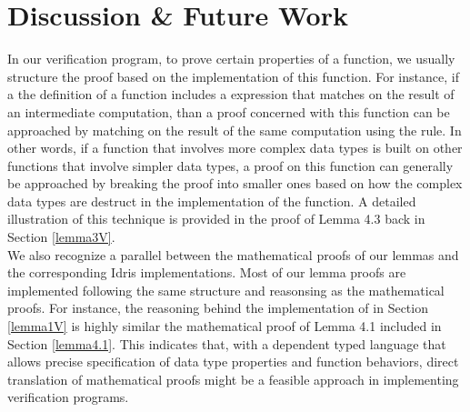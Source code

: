 \section{Discussion \& Future Work} \label{discussion}
In our verification program, to prove certain properties of a function, we usually structure the proof based on the implementation of this function. For instance, if a the definition of a function includes a  expression that matches on the result of an intermediate computation, than a proof concerned with this function can be approached by matching on the result of the same computation using the  rule. In other words, if a function that involves more complex data types is built on other functions that involve simpler data types, a proof on this function can generally be approached by breaking the proof into smaller ones based on how the complex data types are destruct in the implementation of the function. A detailed illustration of this technique is provided in the proof of Lemma 4.3 back in Section \ref{lemma3V}.
\\

We also recognize a parallel between the mathematical proofs of our lemmas and the corresponding Idris implementations. Most of our lemma proofs are implemented following the same structure and reasonsing as the mathematical proofs. For instance, the reasoning behind the implementation of  in Section \ref{lemma1V} is highly similar the mathematical proof of Lemma 4.1 included in Section \ref{lemma4.1}. This indicates that, with a dependent typed language that allows precise specification of data type properties and function behaviors, direct translation of mathematical proofs might be a feasible approach in implementing verification programs.   
\\

